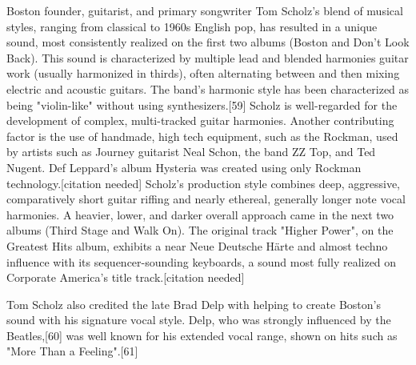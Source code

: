 \documentclass[class=book, crop=false, oneside, 12pt]{standalone}
\begin{document}
Boston founder, guitarist, and primary songwriter Tom Scholz's blend of musical styles, ranging from classical to 1960s English pop, has resulted in a unique sound, most consistently realized on the first two albums (Boston and Don't Look Back). This sound is characterized by multiple lead and blended harmonies guitar work (usually harmonized in thirds), often alternating between and then mixing electric and acoustic guitars. The band's harmonic style has been characterized as being "violin-like" without using synthesizers.[59] Scholz is well-regarded for the development of complex, multi-tracked guitar harmonies. Another contributing factor is the use of handmade, high tech equipment, such as the Rockman, used by artists such as Journey guitarist Neal Schon, the band ZZ Top, and Ted Nugent. Def Leppard's album Hysteria was created using only Rockman technology.[citation needed] Scholz's production style combines deep, aggressive, comparatively short guitar riffing and nearly ethereal, generally longer note vocal harmonies. A heavier, lower, and darker overall approach came in the next two albums (Third Stage and Walk On). The original track "Higher Power", on the Greatest Hits album, exhibits a near Neue Deutsche Härte and almost techno influence with its sequencer-sounding keyboards, a sound most fully realized on Corporate America's title track.[citation needed]

Tom Scholz also credited the late Brad Delp with helping to create Boston's sound with his signature vocal style. Delp, who was strongly influenced by the Beatles,[60] was well known for his extended vocal range, shown on hits such as "More Than a Feeling".[61] 
\end{document}
